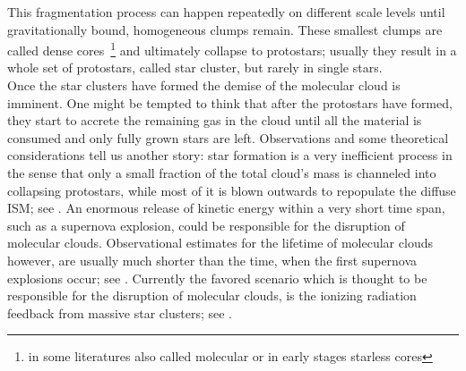 This fragmentation process can happen repeatedly on different scale levels until gravitationally bound, homogeneous clumps remain.
These smallest clumps are called dense cores~\footnote{in some literatures also called molecular or in early stages starless cores} and ultimately collapse to protostars; usually they result in a whole set of protostars, called star cluster, but rarely in single stars.
\\[6pt]
%
Once the star clusters have formed the demise of the molecular cloud is imminent.
One might be tempted to think that after the protostars have formed, they start to accrete the remaining gas in the cloud until all the material is consumed and only fully grown stars are left.
Observations and some theoretical considerations tell us another story: star formation is a very inefficient process in the sense that only a small fraction of the total cloud's mass is channeled into collapsing protostars, while most of it is blown outwards to repopulate the diffuse ISM; see \citet{SF_regulation, Padoan_PP}.
An enormous release of kinetic energy within a very short time span, such as a supernova explosion, could be responsible for the disruption of molecular clouds.
Observational estimates for the lifetime of molecular clouds however, are usually much shorter than the time, when the first supernova explosions occur; see \citet{MC_Masses, MC_supernovas}.
Currently the favored scenario which is thought to be responsible for the disruption of molecular clouds, is the ionizing radiation feedback from massive star clusters; see \citet{MC_disruption, Ionizing_disruption}.


